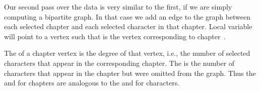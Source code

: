 Our second pass over the data is very similar to the first, if we
are simply computing a bipartite graph. In that case we add an edge
to the graph between each selected chapter and each selected character
in that chapter. Local variable  will point to a
vertex such that  is the vertex corresponding to
chapter~.

The  of a chapter vertex is the degree of that vertex, i.e.,
the
number of selected characters that appear in the corresponding chapter.
The  is the number of characters that appear in the
chapter but were omitted from the graph. Thus the  and
 for chapters are analogous to the  and %
for characters.


